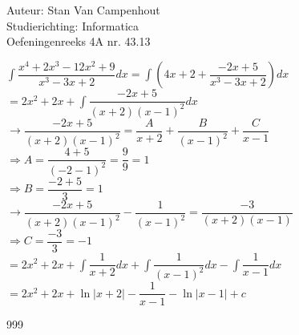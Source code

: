 \documentclass[a4paper]{article}
\begin{document}
  
\noindent \large Auteur: Stan Van Campenhout \\
\noindent \large Studierichting:  Informatica\\
\noindent \large Oefeningenreeks 4A nr. 43.13\\

\medskip

\normalsize

$ \displaystyle\int\dfrac{x^4+2x^3-12x^2+9}{x^3-3x+2}dx = \displaystyle\int\left(4x+2+\dfrac{-2x+5}{x^3-3x+2}\right) dx$\\

$ = 2x^2+2x+\displaystyle\int\dfrac{-2x+5}{\left(x+2\right)\left(x-1\right)^2}dx $\\

$ \rightarrow \dfrac{-2x+5}{\left(x+2\right)\left(x-1\right)^2} = \dfrac{A}{x+2} + \dfrac{B}{\left(x-1\right)^2} + \dfrac{C}{x-1} $\\

$ \Rightarrow A = \dfrac{4+5}{\left(-2-1\right)^2} = \dfrac{9}{9} = 1 $\\

$ \Rightarrow B = \dfrac{-2+5}{3} = 1 $\\

$ \rightarrow \dfrac{-2x+5}{\left(x+2\right)\left(x-1\right)^2}-\dfrac{1}{\left(x-1\right)^2} = \dfrac{-3}{\left(x+2\right)\left(x-1\right)} $\\

$ \Rightarrow C = \dfrac{-3}{3} = -1 $\\

$ = 2x^2+2x+\displaystyle\int\dfrac{1}{x+2}dx + \displaystyle\int\dfrac{1}{\left(x-1\right)^2}dx - \displaystyle\int\dfrac{1}{x-1}dx $\\

$ = 2x^2  +2x +\ln|x+2| - \dfrac{1}{x-1} - \ln|x-1| + c $\\

\begin{thebibliography}{999}
\end{thebibliography}
\end{document}
